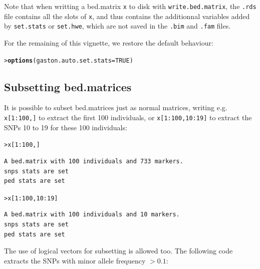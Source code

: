 \documentclass{article}\usepackage[]{graphicx}\usepackage[]{color}
\makeatletter
\newcommand{\hlnum}[1]{\textcolor[rgb]{0.686,0.059,0.569}{#1}}%
\newcommand{\hlopt}[1]{\textcolor[rgb]{0,0,0}{#1}}%
\newcommand{\hlstd}[1]{\textcolor[rgb]{0.345,0.345,0.345}{#1}}%
\newcommand{\hlkwc}[1]{\textcolor[rgb]{0.333,0.667,0.333}{#1}}%
\newcommand{\hlkwd}[1]{\textcolor[rgb]{0.737,0.353,0.396}{\textbf{#1}}}%
\newenvironment{kframe}{%
 \def\at@end@of@kframe{}%
 \ifinner\ifhmode%
  \def\at@end@of@kframe{\end{minipage}}%
  \begin{minipage}{\columnwidth}%
 \fi\fi%
 \def\FrameCommand##1{\hskip\@totalleftmargin \hskip-\fboxsep
 \colorbox{shadecolor}{##1}\hskip-\fboxsep
     \hskip-\linewidth \hskip-\@totalleftmargin \hskip\columnwidth}%
 \MakeFramed {\advance\hsize-\width
   \@totalleftmargin\z@ \linewidth\hsize
   \@setminipage}}%
 {\par\unskip\endMakeFramed%
 \at@end@of@kframe}
\newenvironment{knitrout}{}{} %
\makeatother
\begin{document}
  Note that when writting a bed.matrix \verb!x! to disk with \verb!write.bed.matrix!, 
  the \verb!.rds! file contains all the slots of \verb!x!, and thus contains the additionnal
  variables added by \verb!set.stats! or \verb!set.hwe!, which are not saved in the
  \verb!.bim! and \verb!.fam! files.

  For the remaining of this vignette, we restore the default behaviour:
\begin{knitrout}
\color{fgcolor}\begin{kframe}
\begin{alltt}
\hlstd{> }\hlkwd{options}\hlstd{(}\hlkwc{gaston.auto.set.stats} \hlstd{=} \hlnum{TRUE}\hlstd{)}
\end{alltt}
\end{kframe}
\end{knitrout}

\pagebreak
\subsection{Subsetting bed.matrices}

  It is possible to subset bed.matrices just as normal matrices, writing e.g.
  \verb!x[1:100,]! to extract the first 100 individuals, or \verb!x[1:100,10:19]!
  to extract the SNPs 10 to 19 for these 100 individuals:

\begin{knitrout}
\color{fgcolor}\begin{kframe}
\begin{alltt}
\hlstd{> }\hlstd{x[}\hlnum{1}\hlopt{:}\hlnum{100}\hlstd{,]}
\end{alltt}
\begin{verbatim}
A bed.matrix with 100 individuals and 733 markers.
snps stats are set
ped stats are set
\end{verbatim}
\begin{alltt}
\hlstd{> }\hlstd{x[}\hlnum{1}\hlopt{:}\hlnum{100}\hlstd{,}\hlnum{10}\hlopt{:}\hlnum{19}\hlstd{]}
\end{alltt}
\begin{verbatim}
A bed.matrix with 100 individuals and 10 markers.
snps stats are set
ped stats are set
\end{verbatim}
\end{kframe}
\end{knitrout}

  The use of logical vectors for subsetting is allowed too. The following code extracts 
  the SNPs with minor allele frequency $> 0.1$:
\end{document}
